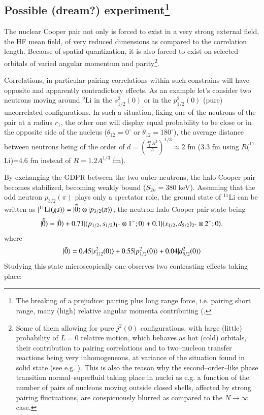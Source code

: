 \begin{subappendices}
\subsection[Possible (dream?) experiment]{Possible (dream?) experiment\footnote{The breaking of a prejudice: pairing plus long range force, i.e. pairing short range, many (high) relative angular momenta contributing (\cite{Kisslinger:63,Soloviev:65,Mottelson:62,Mottelson:02}.}}
 The nuclear Cooper pair not only is forced to exist in a very strong external field, the HF mean field, of very reduced dimensions as compared to the correlation length. Because of spatial quantization, it is also forced to exist on selected orbitals of varied angular momentum and parity\footnote{Some of them allowing for pure $j^2(0)$ configurations, with large (little) probability of $L=0$ relative motion, which behaves as hot (cold) orbitals, their contribution to pairing correlations and to two--nucleon transfer reactions being very inhomogeneous, at variance of the situation found in solid state (see e.g. \cite{Broglia:05}). This is also the reason why the second--order--like phase transition normal--superfluid taking place in nuclei as e.g. a function of the number of pairs of nucleons moving outside closed shells, affected by strong pairing fluctuations, are conspicuously blurred as compared to the $N\rightarrow\infty$ case.}.
 
 
 Correlations, in particular pairing correlations within such constrains will have opposite and apparently contradictory effects. As an example let's consider two neutrons moving around $^9$Li in the $s^2_{1/2}(0)$ or in the   $p^2_{1/2}(0)$ (pure) uncorrelated configurations. In such a situation, fixing one of the neutrons of the pair at a radius $r_1$, the other one will display equal probability to be close or in the opposite side of the nucleus ($\theta_{12}=0^\circ$ or $\theta_{12}=180^\circ$), the average distance between neutrons being of the order of $d=\left(\frac{\frac{4\pi}{3}R^3}{A}\right)^{1/3}\approx 2$ fm (3.3 fm using $R(^{11}$Li)=4.6 fm instead of $R=1.2 A^{1/3}$ fm).
 
 By exchanging the GDPR between the two outer neutrons, the halo Cooper pair becomes stabilized, becoming weakly bound ($S_{2n}=380$ keV). Assuming that the odd neutron $p_{3/2}(\pi)$ plays only a spectator role, the ground state of $^{11}$Li can be written as $|{^{11}\text{Li}(gs)} \rangle=|{\tilde{\tilde 0}} \rangle\otimes|{p_{3/2}(\pi)} \rangle$, the neutron halo Cooper pair state being
    \begin{align}
|{\tilde{\tilde 0}} \rangle=|{\tilde 0} \rangle+0.71|{(p_{1/2},s_{1/2})_{1^-}\otimes 1^{-};0} \rangle+0.1|{(s_{1/2},d_{5/2})_{2^+}\otimes 2^{+};0} \rangle.
    \end{align}
    where
        \begin{align}\label{eq3.B.27}
        |{\tilde 0} \rangle= 0.45|{s^2_{1/2}(0)} \rangle+0.55|{p^2_{1/2}(0)} \rangle+0.04|{d^2_{5/2}(0)} \rangle
        \end{align}
    Studying this state microscopically one observes two contrasting effects taking place:
    

\end{subappendices}
